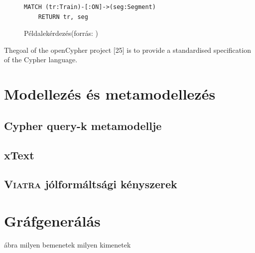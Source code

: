 \begin{figure}
	\begin{lstlisting}[style=viatrasmall]
	MATCH (tr:Train)-[:ON]->(seg:Segment)
	RETURN tr, seg	
	\end{lstlisting}   
	\caption{Példalekérdezés(forrás: \cite{marton2017model} )}
	\label{fig:példalekérdezes}
\end{figure}


Thegoal of the openCypher project [25] is to provide a standardised specification of
the Cypher language.






\section{Modellezés és metamodellezés}


\subsection{Cypher query-k metamodellje}
\subsection{xText}
\subsection{\textsc{Viatra} jólformáltsági kényszerek}

\section{Gráfgenerálás}

ábra milyen bemenetek milyen kimenetek






